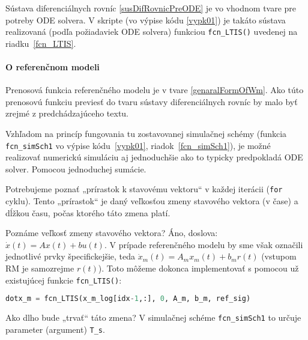 \documentclass[a4paper, 10pt, ]{article}
\begin{document}
Sústava diferenciálnych rovníc \eqref{susDifRovnicPreODE} je vo vhodnom tvare pre potreby ODE solvera. V skripte (vo výpise kódu \ref{vypk01}) je takáto sústava realizovaná (podľa požiadaviek ODE solvera) funkciou \lstinline|fcn_LTIS()| uvedenej na riadku~\ref{fcn_LTIS}.






\paragraph{O referenčnom modeli}

Prenosová funkcia referenčného modelu je v tvare \eqref{genaralFormOfWm}. Ako túto prenosovú funkciu previesť do tvaru sústavy diferenciálnych rovníc by malo byť zrejmé z predchádzajúceho textu.

Vzhľadom na princíp fungovania tu zostavovanej simulačnej schémy (funkcia \lstinline|fcn_simSch1| vo výpise kódu~\ref{vypk01}, riadok~\ref{fcn_simSch1}), je možné realizovať numerickú simuláciu aj jednoduchšie ako to typicky predpokladá ODE solver. Pomocou jednoduchej sumácie.

Potrebujeme poznať „prírastok k stavovému vektoru“ v každej iterácii (\lstinline|for| cyklu). Tento „prírastok“ je daný veľkosťou zmeny stavového vektora (v čase) a dĺžkou času, počas ktorého táto zmena platí.

Poznáme veľkosť zmeny stavového vektora? Áno, doslova: $\dot x(t) = A x(t) + b u(t)$. V prípade referenčného modelu by sme však označili jednotlivé prvky špecifickejšie, teda $\dot x_m(t) = A_m x_m(t) + b_m r(t)$ (vstupom RM je samozrejme $r(t)$). Toto môžeme dokonca implementovať s pomocou už existujúcej funkcie \lstinline|fcn_LTIS()|:
\begin{lstlisting}[language=Python,
                    numbers=none,
                    caption={},
                    label={vypk_sht01},
                    ]
dotx_m = fcn_LTIS(x_m_log[idx-1,:], 0, A_m, b_m, ref_sig)
\end{lstlisting}



Ako dlho bude „trvať“ táto zmena? V simulačnej schéme \lstinline|fcn_simSch1| to určuje parameter (argument) \lstinline|T_s|.
\end{document}
